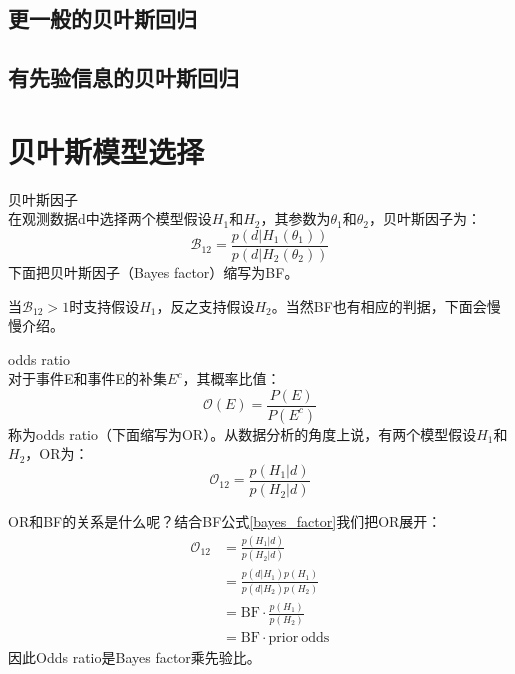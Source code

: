 \subsection{更一般的贝叶斯回归}
\subsection{有先验信息的贝叶斯回归}
\section{贝叶斯模型选择}
\begin{definition}{贝叶斯因子\\}
    在观测数据d中选择两个模型假设$H_1$和$H_2$，其参数为$\theta_1$和$\theta_2$，贝叶斯因子为：
    \begin{equation}
        \mathcal{B}_{12}=\frac{p(d|H_1(\theta_1))}{p(d|H_2(\theta_2))} \label{bayes_factor}
    \end{equation}
    下面把贝叶斯因子（Bayes factor）缩写为BF。
\end{definition}
当$\mathcal{B}_{12}>1$时支持假设$H_1$，反之支持假设$H_2$。当然BF也有相应的判据，下面会慢慢介绍。
\begin{definition}{odds ratio\\}
    对于事件E和事件E的补集$E^c$，其概率比值：
    \begin{equation}
        \mathcal{O}(E)=\frac{P(E)}{P(E^c)}
    \end{equation}
    称为\textrm{odds ratio}（下面缩写为OR）。从数据分析的角度上说，有两个模型假设$H_1$和$H_2$，OR为：
    \begin{equation}
        \mathcal{O}_{12}=\frac{p(H_1|d)}{p(H_2|d)} \label{ORs}
    \end{equation}
\end{definition}
OR和BF的关系是什么呢？结合BF公式\ref{bayes_factor}我们把OR展开：
\begin{equation}
    \begin{aligned}
        \mathcal{O}_{12} &= \frac{p(H_1|d)}{p(H_2|d)}\\
        &= \frac{p(d|H_1)p(H_1)}{p(d|H_2)p(H_2)}\\
        &= \mathrm{BF}\cdot\frac{p(H_1)}{p(H_2)}\\
        &= \mathrm{BF}\cdot \mathrm{prior\ odds}
    \end{aligned}
\end{equation}
因此Odds ratio是Bayes factor乘先验比。

